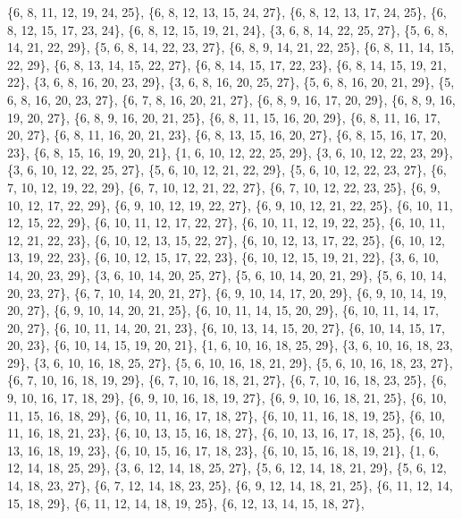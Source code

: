 \documentclass[11pt,a4paper]{article}
\begin{document}
{\{6, 8, 11, 12, 19, 24, 25\}, \{6, 8, 12, 13, 15, 24, 27\}, \{6, 8, 12, 13, 17, 24, 25\}, \{6, 8, 12, 15, 17, 23, 24\}, \{6, 8, 12, 15, 19, 21, 24\},
\{3, 6, 8, 14, 22, 25, 27\}, \{5, 6, 8, 14, 21, 22, 29\}, \{5, 6, 8, 14, 22, 23, 27\}, \{6, 8, 9, 14, 21, 22, 25\}, \{6, 8, 11, 14, 15, 22, 29\},
\{6, 8, 13, 14, 15, 22, 27\}, \{6, 8, 14, 15, 17, 22, 23\}, \{6, 8, 14, 15, 19, 21, 22\}, \{3, 6, 8, 16, 20, 23, 29\}, \{3, 6, 8, 16, 20, 25, 27\},
\{5, 6, 8, 16, 20, 21, 29\}, \{5, 6, 8, 16, 20, 23, 27\}, \{6, 7, 8, 16, 20, 21, 27\}, \{6, 8, 9, 16, 17, 20, 29\}, \{6, 8, 9, 16, 19, 20, 27\},
\{6, 8, 9, 16, 20, 21, 25\}, \{6, 8, 11, 15, 16, 20, 29\}, \{6, 8, 11, 16, 17, 20, 27\}, \{6, 8, 11, 16, 20, 21, 23\}, \{6, 8, 13, 15, 16, 20, 27\},
\{6, 8, 15, 16, 17, 20, 23\}, \{6, 8, 15, 16, 19, 20, 21\}, \{1, 6, 10, 12, 22, 25, 29\}, \{3, 6, 10, 12, 22, 23, 29\}, \{3, 6, 10, 12, 22, 25, 27\},
\{5, 6, 10, 12, 21, 22, 29\}, \{5, 6, 10, 12, 22, 23, 27\}, \{6, 7, 10, 12, 19, 22, 29\}, \{6, 7, 10, 12, 21, 22, 27\}, \{6, 7, 10, 12, 22, 23, 25\},
\{6, 9, 10, 12, 17, 22, 29\}, \{6, 9, 10, 12, 19, 22, 27\}, \{6, 9, 10, 12, 21, 22, 25\}, \{6, 10, 11, 12, 15, 22, 29\}, \{6, 10, 11, 12, 17, 22, 27\},
\{6, 10, 11, 12, 19, 22, 25\}, \{6, 10, 11, 12, 21, 22, 23\}, \{6, 10, 12, 13, 15, 22, 27\}, \{6, 10, 12, 13, 17, 22, 25\}, \{6, 10, 12, 13, 19, 22, 23\},
\{6, 10, 12, 15, 17, 22, 23\}, \{6, 10, 12, 15, 19, 21, 22\}, \{3, 6, 10, 14, 20, 23, 29\}, \{3, 6, 10, 14, 20, 25, 27\}, \{5, 6, 10, 14, 20, 21, 29\},
\{5, 6, 10, 14, 20, 23, 27\}, \{6, 7, 10, 14, 20, 21, 27\}, \{6, 9, 10, 14, 17, 20, 29\}, \{6, 9, 10, 14, 19, 20, 27\}, \{6, 9, 10, 14, 20, 21, 25\},
\{6, 10, 11, 14, 15, 20, 29\}, \{6, 10, 11, 14, 17, 20, 27\}, \{6, 10, 11, 14, 20, 21, 23\}, \{6, 10, 13, 14, 15, 20, 27\}, \{6, 10, 14, 15, 17, 20, 23\},
\{6, 10, 14, 15, 19, 20, 21\}, \{1, 6, 10, 16, 18, 25, 29\}, \{3, 6, 10, 16, 18, 23, 29\}, \{3, 6, 10, 16, 18, 25, 27\}, \{5, 6, 10, 16, 18, 21, 29\},
\{5, 6, 10, 16, 18, 23, 27\}, \{6, 7, 10, 16, 18, 19, 29\}, \{6, 7, 10, 16, 18, 21, 27\}, \{6, 7, 10, 16, 18, 23, 25\}, \{6, 9, 10, 16, 17, 18, 29\},
\{6, 9, 10, 16, 18, 19, 27\}, \{6, 9, 10, 16, 18, 21, 25\}, \{6, 10, 11, 15, 16, 18, 29\}, \{6, 10, 11, 16, 17, 18, 27\}, \{6, 10, 11, 16, 18, 19, 25\},
\{6, 10, 11, 16, 18, 21, 23\}, \{6, 10, 13, 15, 16, 18, 27\}, \{6, 10, 13, 16, 17, 18, 25\}, \{6, 10, 13, 16, 18, 19, 23\}, \{6, 10, 15, 16, 17, 18, 23\},
\{6, 10, 15, 16, 18, 19, 21\}, \{1, 6, 12, 14, 18, 25, 29\}, \{3, 6, 12, 14, 18, 25, 27\}, \{5, 6, 12, 14, 18, 21, 29\}, \{5, 6, 12, 14, 18, 23, 27\},
\{6, 7, 12, 14, 18, 23, 25\}, \{6, 9, 12, 14, 18, 21, 25\}, \{6, 11, 12, 14, 15, 18, 29\}, \{6, 11, 12, 14, 18, 19, 25\}, \{6, 12, 13, 14, 15, 18, 27\},
}
\end{document}
